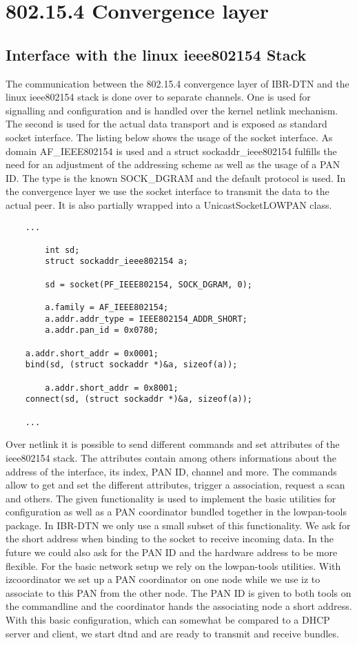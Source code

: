\chapter{802.15.4 Convergence layer}
\label{802154layer}
\section{Interface with the linux ieee802154 Stack}

The communication between the 802.15.4 convergence layer of IBR-DTN and the
linux ieee802154 stack is done over to separate channels. One is used for
signalling and configuration and is handled over the kernel netlink mechanism.
The second is used for the actual data transport and is exposed as standard
socket interface. The listing below shows the usage of the socket interface. As
domain AF\_IEEE802154 is used and a struct sockaddr\_ieee802154 fulfills the
need for an adjustment of the addressing scheme as well as the usage of a PAN
ID. The type is the known SOCK\_DGRAM and the default protocol is used. In the
convergence layer we use the socket interface to transmit the data to the actual
peer. It is also partially wrapped into a UnicastSocketLOWPAN class.

\begin{lstlisting}
	...

        int sd;
        struct sockaddr_ieee802154 a;

        sd = socket(PF_IEEE802154, SOCK_DGRAM, 0);

        a.family = AF_IEEE802154;
        a.addr.addr_type = IEEE802154_ADDR_SHORT;
        a.addr.pan_id = 0x0780;

	a.addr.short_addr = 0x0001;
	bind(sd, (struct sockaddr *)&a, sizeof(a));

        a.addr.short_addr = 0x8001;
	connect(sd, (struct sockaddr *)&a, sizeof(a));

	...
\end{lstlisting}

Over netlink it is possible to send different commands and set attributes of the
ieee802154 stack. The attributes contain among others informations about the
address of the interface, its index, PAN ID, channel and more. The commands
allow to get and set the different attributes, trigger a association, request a
scan and others. The given functionality is used to implement the basic
utilities for configuration as well as a PAN coordinator bundled together in
the lowpan-tools package. In IBR-DTN we only use a small subset of this
functionality. We ask for the short address when binding to the socket to
receive incoming data. In the future we could also ask for the PAN ID and the
hardware address to be more flexible. For the basic network setup we rely on the
lowpan-tools utilities. With izcoordinator we set up a PAN coordinator on one
node while we use iz to associate to this PAN from the other node. The PAN ID is
given to both tools on the commandline and the coordinator hands the
associating node a short address. With this basic configuration, which can
somewhat be compared to a DHCP server and client, we start dtnd and are ready to
transmit and receive bundles.

